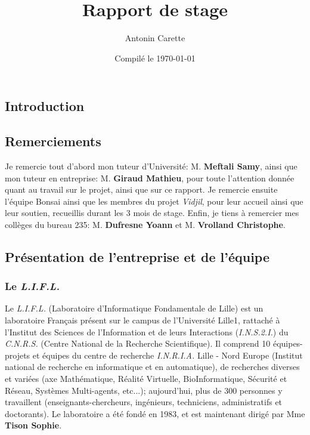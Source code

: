 \documentclass[12pt]{report}
\title{Rapport de stage}
\author{Antonin Carette}
\date{Compilé le \today}
\begin{document}
\begin{spacing}{1.2}

\maketitle

\tableofcontents

\chapter*{Introduction}


\section{Remerciements}
Je remercie tout d'abord mon tuteur d'Université: M. \textbf{Meftali Samy}, ainsi que mon tuteur en entreprise: M. \textbf{Giraud Mathieu}, pour toute l'attention donnée quant au travail sur le projet, ainsi que sur ce rapport.
\newline
Je remercie ensuite l'équipe Bonsai ainsi que les membres du projet \textit{Vidjil}, pour leur accueil ainsi que leur soutien, recueillis durant les 3 mois de stage.
\newline
Enfin, je tiens à remercier mes collèges du bureau 235: M. \textbf{Dufresne Yoann} et M. \textbf{Vrolland Christophe}.

\section{Présentation de l'entreprise et de l'équipe}

\subsection{Le \textit{L.I.F.L.}}
Le \textit{L.I.F.L.} (Laboratoire d'Informatique Fondamentale de Lille) est un laboratoire Français présent sur le campus de l'Université Lille1, rattaché à l'Institut des Sciences de l'Information et de leurs Interactions (\textit{I.N.S.2.I.}) du \textit{C.N.R.S.} (Centre National de la Recherche Scientifique).
\newline
Il comprend 10 équipes-projets et équipes du centre de recherche \textit{I.N.R.I.A.} Lille - Nord Europe (Institut national de recherche en informatique et en automatique), de recherches diverses et variées (axe Mathématique, Réalité Virtuelle, BioInformatique, Sécurité et Réseau, Systèmes Multi-agents, etc...); aujourd'hui, plus de 300 personnes y travaillent (enseignants-chercheurs, ingénieurs, techniciens, administratifs et doctorants).
\newline
Le laboratoire a été fondé en 1983, et est maintenant dirigé par Mme \textbf{Tison Sophie}.


\end{spacing}
\end{document}
